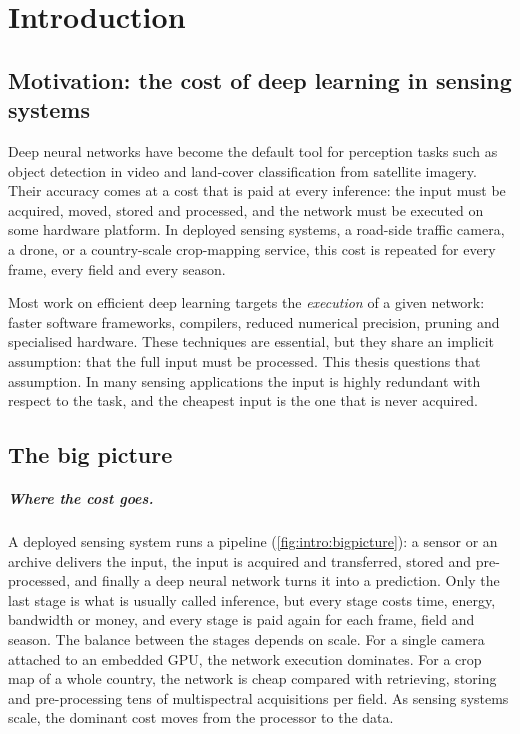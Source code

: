 \chapter{Introduction}
\label{ch:intro}

\section{Motivation: the cost of deep learning in sensing systems}
\label{sec:intro:motivation}

Deep neural networks have become the default tool for perception tasks such as
object detection in video and land-cover classification from satellite imagery.
Their accuracy comes at a cost that is paid at every inference: the input must
be acquired, moved, stored and processed, and the network must be executed on
some hardware platform. In deployed sensing systems, a road-side traffic
camera, a drone, or a country-scale crop-mapping service, this cost is repeated
for every frame, every field and every season.

Most work on efficient deep learning targets the \emph{execution} of a given
network: faster software frameworks, compilers, reduced numerical precision,
pruning and specialised hardware. These techniques are essential, but they share
an implicit assumption: that the full input must be processed. This thesis
questions that assumption. In many sensing applications the input is highly
redundant with respect to the task, and the cheapest input is the one that is
never acquired.

\section{The big picture}
\label{sec:intro:bigpicture}

\paragraph{Where the cost goes.}
A deployed sensing system runs a pipeline (\cref{fig:intro:bigpicture}): a
sensor or an archive delivers the input, the input is acquired and transferred,
stored and pre-processed, and finally a deep neural network turns it into a
prediction. Only the last stage is what is usually called inference, but every
stage costs time, energy, bandwidth or money, and every stage is paid again for
each frame, field and season. The balance between the stages depends on scale.
For a single camera attached to an embedded GPU, the network execution
dominates. For a crop map of a whole country, the network is cheap compared with
retrieving, storing and pre-processing tens of multispectral acquisitions per
field. As sensing systems scale, the dominant cost moves from the processor to
the data.


